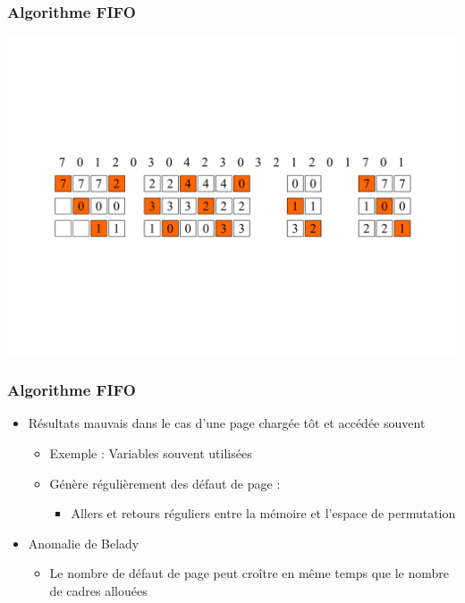 \begin{frame}
\frametitle{Algorithme FIFO}
\includegraphics[width=\textwidth]{../illustration/remplacement_fifo.pdf}
\end{frame}


\begin{frame}
\frametitle{Algorithme FIFO}
\begin{itemize}
\item Résultats mauvais dans le cas d'une page chargée tôt et accédée souvent
\begin{itemize}
\item Exemple : Variables souvent utilisées
\item Génère régulièrement des défaut de page :
\begin{itemize}
  \item Allers et retours réguliers entre la mémoire et l'espace de permutation
\end{itemize}
\end{itemize}
\item Anomalie de Belady
\begin{itemize}
\item Le nombre de défaut de page peut croître en même temps que le nombre de cadres allouées
\end{itemize}
\end{itemize}
\end{frame}

